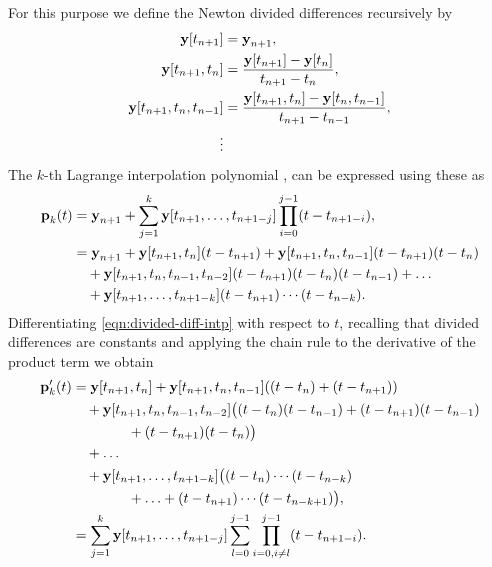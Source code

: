 For this purpose we define the Newton divided differences recursively by
\begin{equation}
  \label{eqn:divided-diff}
  \begin{aligned}
    \boldsymbol{\mathrm{y}}[t_{n+1}] &= \boldsymbol{\mathrm{y}}_{n+1}, \\
    \boldsymbol{\mathrm{y}}[t_{n+1}, t_n] &= \frac{\boldsymbol{\mathrm{y}}[t_{n+1}] - \boldsymbol{\mathrm{y}}[t_n]}{t_{n+1} - t_n}, \\
    \boldsymbol{\mathrm{y}}[t_{n+1}, t_n, t_{n-1}] &= \frac{\boldsymbol{\mathrm{y}}[t_{n+1}, t_n] - \boldsymbol{\mathrm{y}}[t_n, t_{n-1}]}{t_{n+1} - t_{n-1}}, \\
    \vdots
  \end{aligned}
\end{equation}
The $k$-th Lagrange interpolation polynomial \cite[124]{BurdenFaires}, \cite[400]{HairerNorsettWanner} can be expressed using these as
\begin{equation}
  \label{eqn:divided-diff-intp}
  \begin{aligned}
    {\boldsymbol{\mathrm{p}}}_k(t) &= \boldsymbol{\mathrm{y}}_{n+1} + \sum_{j=1}^k \boldsymbol{\mathrm{y}}[t_{n+1}, \ldots, t_{n+1-j}] \prod_{i=0}^{j-1} (t - t_{n+1-i}), \\
    &= \boldsymbol{\mathrm{y}}_{n+1} + \boldsymbol{\mathrm{y}}[t_{n+1}, t_n](t - t_{n+1}) + \boldsymbol{\mathrm{y}}[t_{n+1}, t_n, t_{n-1}](t - t_{n+1})(t - t_n) \\
    &\quad + \boldsymbol{\mathrm{y}}[t_{n+1}, t_n, t_{n-1}, t_{n-2}](t - t_{n+1})(t - t_n)(t - t_{n-1}) + \ldots \\
    &\quad + \boldsymbol{\mathrm{y}}[t_{n+1}, \ldots, t_{n+1-k}](t-t_{n+1})\cdots(t-t_{n-k}).
  \end{aligned}
\end{equation}
Differentiating \cref{eqn:divided-diff-intp} with respect to $t$, recalling that divided differences are constants and applying the chain rule to the derivative of the product term we obtain
\begin{equation}
  \begin{aligned}
    {\boldsymbol{\mathrm{p}}}_k'(t) &= \boldsymbol{\mathrm{y}}[t_{n+1}, t_n] + \boldsymbol{\mathrm{y}}[t_{n+1}, t_n, t_{n-1}]{\left( (t - t_n) + (t - t_{n+1}) \right)} \\
    &\quad + \boldsymbol{\mathrm{y}}[t_{n+1}, t_n, t_{n-1}, t_{n-2}]\big( (t - t_n)(t - t_{n-1}) + (t - t_{n+1})(t - t_{n-1})\\
    &\qquad \qquad  + (t - t_{n+1})(t - t_n) \big) \\
    &\quad + \ldots \\
    &\quad + \boldsymbol{\mathrm{y}}[t_{n+1}, \ldots, t_{n+1-k}]\big( (t-t_{n})\cdots(t-t_{n-k}) \\
    &\qquad \qquad + \ldots + (t-t_{n+1})\cdots(t-t_{n-k+1}) \big), \\
    &= \sum_{j=1}^k \boldsymbol{\mathrm{y}}[t_{n+1}, \ldots, t_{n+1-j}] \sum_{l=0}^{j-1}
    \prod_{i=0, i \neq l}^{j-1} (t - t_{n+1-i}).
    \label{eq:59}
  \end{aligned}
\end{equation}
